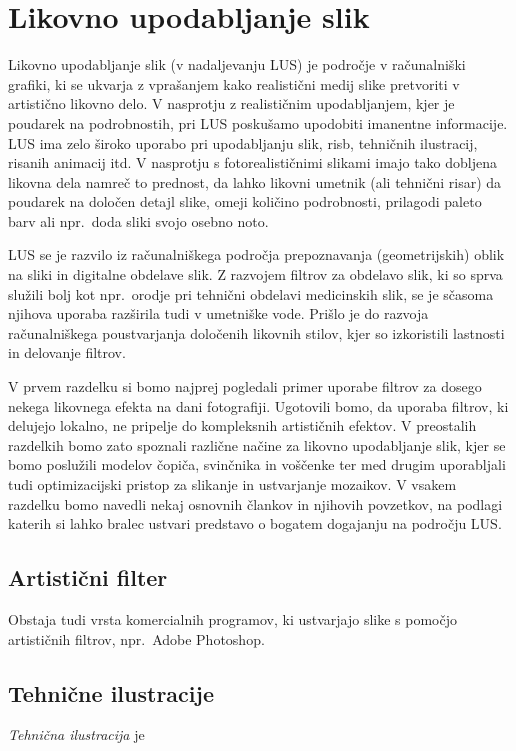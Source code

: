\chapter{Likovno upodabljanje slik}\label{chp:LikovnoUpodabljanjeSlik}
%
Likovno upodabljanje slik (v nadaljevanju LUS) je področje v računalniški grafiki, ki se ukvarja z vprašanjem kako realistični medij slike pretvoriti v artistično likovno delo. V nasprotju z realističnim upodabljanjem, kjer je poudarek na podrobnostih, pri LUS poskušamo upodobiti imanentne informacije. LUS ima zelo široko uporabo pri upodabljanju slik, risb, tehničnih ilustracij, risanih animacij itd. V nasprotju s fotorealističnimi slikami imajo tako dobljena likovna dela namreč to prednost, da lahko likovni umetnik (ali tehnični risar) da poudarek na določen detajl slike, omeji količino podrobnosti, prilagodi paleto barv ali npr.\ doda sliki svojo osebno noto.

LUS se je razvilo iz računalniškega področja prepoznavanja (geometrijskih) oblik na sliki in digitalne obdelave slik. Z razvojem filtrov za obdelavo slik, ki so sprva služili bolj kot npr.~orodje pri tehnični obdelavi medicinskih slik, se je sčasoma njihova uporaba razširila tudi v umetniške vode. Prišlo je do razvoja računalniškega poustvarjanja določenih li\-kov\-ni\-h stilov, kjer so izkoristili lastnosti in delovanje filtrov. 

V prvem razdelku si bomo najprej pogledali primer uporabe filtrov za dosego nekega likovnega efekta na dani fotografiji. Ugotovili bomo, da uporaba filtrov, ki delujejo lokalno, ne pripelje do kompleksnih artističnih efektov. V preostalih razdelkih bomo zato spoznali različne načine za likovno upodabljanje slik, kjer se bomo poslužili modelov čopiča, svinčnika in voščenke ter med drugim uporabljali tudi optimizacijski pristop za slikanje in ustvarjanje mozaikov. V vsakem razdelku bomo navedli nekaj osnovnih člankov in njihovih povzetkov, na podlagi katerih si lahko bralec ustvari predstavo o bogatem dogajanju na področju LUS.
\section{Artistični filter}\label{sec:ArtisticniFilter}
%
Obstaja tudi vrsta komercialnih programov, ki ustvarjajo slike s pomočjo artističnih filtrov, npr.\ Adobe Photoshop.
\section{Tehnične ilustracije}
%
\emph{Tehnična ilustracija} je

